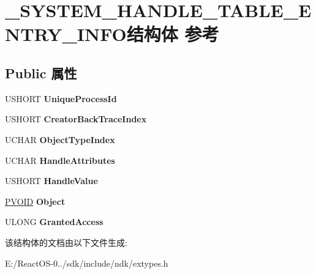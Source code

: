 \hypertarget{struct___s_y_s_t_e_m___h_a_n_d_l_e___t_a_b_l_e___e_n_t_r_y___i_n_f_o}{}\section{\+\_\+\+S\+Y\+S\+T\+E\+M\+\_\+\+H\+A\+N\+D\+L\+E\+\_\+\+T\+A\+B\+L\+E\+\_\+\+E\+N\+T\+R\+Y\+\_\+\+I\+N\+F\+O结构体 参考}
\label{struct___s_y_s_t_e_m___h_a_n_d_l_e___t_a_b_l_e___e_n_t_r_y___i_n_f_o}
\subsection*{Public 属性}
\begin{DoxyCompactItemize}
\item 
\mbox{\label{struct___s_y_s_t_e_m___h_a_n_d_l_e___t_a_b_l_e___e_n_t_r_y___i_n_f_o_a3cb6830afe5edf8b4cf5f02016dce2ce}} 
U\+S\+H\+O\+RT {\bfseries Unique\+Process\+Id}
\item 
\mbox{\label{struct___s_y_s_t_e_m___h_a_n_d_l_e___t_a_b_l_e___e_n_t_r_y___i_n_f_o_a1f1cb21d6991efa5a2eaed21d5e20ae3}} 
U\+S\+H\+O\+RT {\bfseries Creator\+Back\+Trace\+Index}
\item 
\mbox{\label{struct___s_y_s_t_e_m___h_a_n_d_l_e___t_a_b_l_e___e_n_t_r_y___i_n_f_o_a75344837a1abd686756998e33efc2044}} 
U\+C\+H\+AR {\bfseries Object\+Type\+Index}
\item 
\mbox{\label{struct___s_y_s_t_e_m___h_a_n_d_l_e___t_a_b_l_e___e_n_t_r_y___i_n_f_o_af9972a9aba87cf1e2729c2d0e03c6108}} 
U\+C\+H\+AR {\bfseries Handle\+Attributes}
\item 
\mbox{\label{struct___s_y_s_t_e_m___h_a_n_d_l_e___t_a_b_l_e___e_n_t_r_y___i_n_f_o_af96adef78cbce10be695c24c86baa33c}} 
U\+S\+H\+O\+RT {\bfseries Handle\+Value}
\item 
\mbox{\label{struct___s_y_s_t_e_m___h_a_n_d_l_e___t_a_b_l_e___e_n_t_r_y___i_n_f_o_a0a55bd9a98fa006567884c37f18bfd96}} 
\hyperlink{interfacevoid}{P\+V\+O\+ID} {\bfseries Object}
\item 
\mbox{\label{struct___s_y_s_t_e_m___h_a_n_d_l_e___t_a_b_l_e___e_n_t_r_y___i_n_f_o_aafe3ea43ffedb478b6e2a5394a89b981}} 
U\+L\+O\+NG {\bfseries Granted\+Access}
\end{DoxyCompactItemize}


该结构体的文档由以下文件生成\+:\begin{DoxyCompactItemize}
\item 
E\+:/\+React\+O\+S-\/0../sdk/include/ndk/extypes.\+h\end{DoxyCompactItemize}
